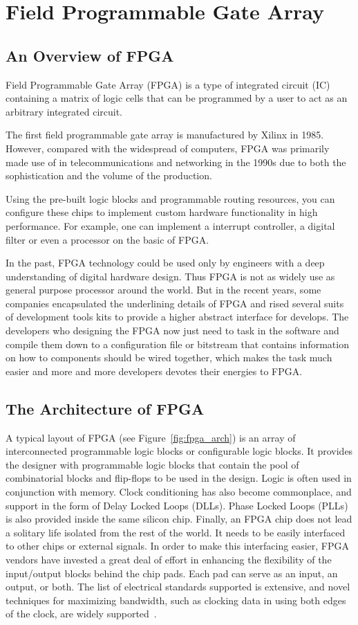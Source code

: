 \section{Field Programmable Gate Array}

\subsection{An Overview of FPGA}
Field Programmable Gate Array (FPGA) is a type of integrated circuit (IC)
containing a matrix of logic cells that can be programmed by a user to act
as an arbitrary integrated circuit.

The first field programmable gate array is manufactured by Xilinx
in 1985. However, compared with the widespread of computers, FPGA
was primarily made use of in telecommunications and networking in
the 1990s due to both the sophistication and the volume of the production.

Using the pre-built logic blocks and
programmable routing resources, you can configure these chips to implement
custom hardware functionality in high performance. For example, one can implement a
interrupt controller, a digital filter or even a processor on the basic of
FPGA.

In the past, FPGA technology could be used only by
engineers with a deep understanding of digital hardware design. Thus FPGA is
not as widely use as general purpose processor around the world. But in
the recent years, some companies encapsulated the underlining details of
FPGA and rised several suits of development tools kits to provide a higher
abstract interface for develops. The developers who designing the FPGA now
just need to task in the software and compile them down to a configuration
file or bitstream that contains information on how to components should be
wired together, which makes the task much easier and more and more
developers devotes their energies to FPGA.

\subsection{The Architecture of FPGA}

A typical layout of FPGA (see Figure~\ref{fig:fpga_arch}) is an array of
interconnected programmable logic blocks or configurable logic blocks. It
provides the designer with programmable logic blocks that contain the pool
of combinatorial blocks and flip-flops to be used in the design. Logic is
often used in conjunction with memory. Clock conditioning has also become
commonplace, and support in the form of Delay Locked Loops (DLLs). Phase
Locked Loops (PLLs) is also provided inside the same silicon chip. Finally,
an FPGA chip does not lead a solitary life isolated from the rest of the
world. It needs to be easily interfaced to other chips or external signals.
In order to make this interfacing easier, FPGA vendors have invested a
great deal of effort in enhancing the flexibility of the input/output
blocks behind the chip pads. Each pad can serve as an input, an output, or
both. The list of electrical standards supported is extensive, and novel
techniques for maximizing bandwidth, such as clocking data in using both
edges of the clock, are widely supported~\cite{fpgaintro}.

